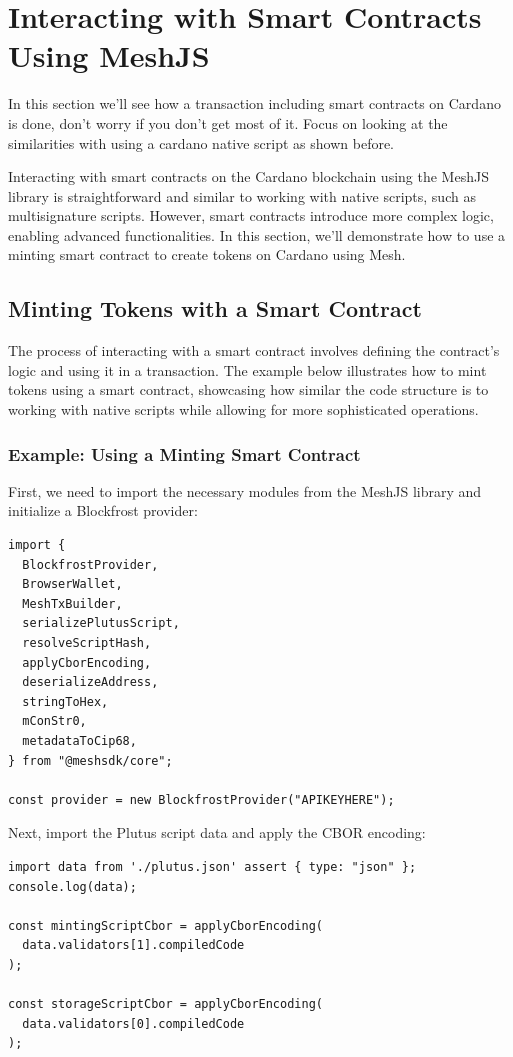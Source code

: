 \section{Interacting with Smart Contracts Using MeshJS}

In this section we'll see how a transaction including smart contracts on Cardano is done, don't worry if you don't get most of it. Focus on looking at the similarities with using a cardano native script as shown before.

Interacting with smart contracts on the Cardano blockchain using the MeshJS library is straightforward and similar to working with native scripts, such as multisignature scripts. However, smart contracts introduce more complex logic, enabling advanced functionalities. In this section, we'll demonstrate how to use a minting smart contract to create tokens on Cardano using Mesh.

\subsection{Minting Tokens with a Smart Contract}

The process of interacting with a smart contract involves defining the contract's logic and using it in a transaction. The example below illustrates how to mint tokens using a smart contract, showcasing how similar the code structure is to working with native scripts while allowing for more sophisticated operations.

\subsubsection{Example: Using a Minting Smart Contract}

First, we need to import the necessary modules from the MeshJS library and initialize a Blockfrost provider:

\begin{lstlisting}
import {
  BlockfrostProvider,
  BrowserWallet,
  MeshTxBuilder,
  serializePlutusScript,
  resolveScriptHash,
  applyCborEncoding,
  deserializeAddress,
  stringToHex,
  mConStr0,
  metadataToCip68,
} from "@meshsdk/core";

const provider = new BlockfrostProvider("APIKEYHERE");
\end{lstlisting}

Next, import the Plutus script data and apply the CBOR encoding:

\begin{lstlisting}
import data from './plutus.json' assert { type: "json" };
console.log(data);

const mintingScriptCbor = applyCborEncoding(
  data.validators[1].compiledCode
);

const storageScriptCbor = applyCborEncoding(
  data.validators[0].compiledCode
);
\end{lstlisting}

